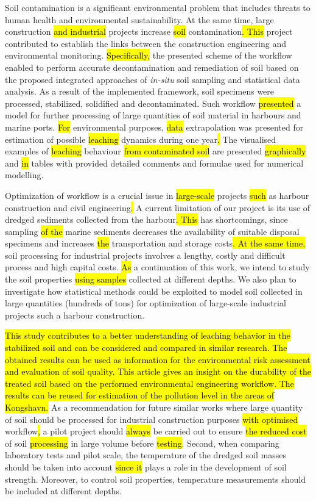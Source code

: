 \documentclass[algorithms,article,submit,pdftex,moreauthors]{Definitions/mdpi}
\begin{document}
Soil contamination is a significant environmental problem that includes threats to human health and environmental sustainability. At the same time, large construction \hl{and industrial }projects increase \hl{soil} contamination\hl{. This} project contributed to establish the links between the construction engineering and environmental monitoring. \hl{Specifically, }the presented scheme of the workflow enabled to perform accurate decontamination and remediation of soil based on the proposed integrated approaches of \emph{in-situ} soil sampling and statistical data analysis. As a result of the implemented framework, soil specimens were processed, stabilized, solidified and decontaminated. Such\hl{ }workflow \hl{presented} a model for further processing of large quantities of soil material in harbours and marine ports. \hl{For} environmental purposes, \hl{data} extrapolation was presented for estimation of possible \hl{leaching }dynamics during one\hl{ }year\hl{. }The visualised examples of \hl{leaching} behaviour \hl{from contaminated soil} are presented \hl{graphically} and \hl{in }tables with provided detailed comments and formulae used for numerical modelling.

Optimization of workflow is a crucial issue in \hl{large-scale} projects \hl{such }as harbour construction and\hl{ }civil engineering\hl{. }A current limitation of our project is its use of dredged sediments collected from the harbour\hl{. This} has shortcomings, since sampling \hl{of the }marine sediments decreases the availability of suitable disposal specimens and increases \hl{the }transportation and storage costs\hl{. At the same time, }soil processing for industrial projects involves a lengthy, costly and difficult process and high capital costs. \hl{As} a continuation of this work, we intend to study the\hl{ }soil properties \hl{using samples }collected at different depths. We also plan to investigate how statistical methods could be exploited to model soil collected in large quantities (hundreds of tons) for optimization of large-scale industrial projects such a harbour construction. 

\hl{This study contributes to a better understanding of leaching behavior in the stabilized soil and can be considered and compared in similar research. The obtained results  can be used as information for the environmental risk assessment and evaluation of soil quality. This article gives an insight on the durability of the treated soil based on the performed environmental engineering workflow. The results can be reused for estimation of the pollution level in the areas of Kongshavn.} As a recommendation for future similar works where large quantity of soil\hl{ }should be processed for industrial construction purposes \hl{with optimised } workflow\hl{, }a pilot project should \hl{always }be carried out to ensure \hl{the reduced cost} of soil \hl{processing} in large volume before \hl{testing}. Second, when comparing laboratory tests and pilot scale, the temperature of the dredged soil masses should be taken into account \hl{since it} plays a role in the development of soil strength. Moreover, to control soil properties, temperature measurements should be included at different depths. 
\end{document}
